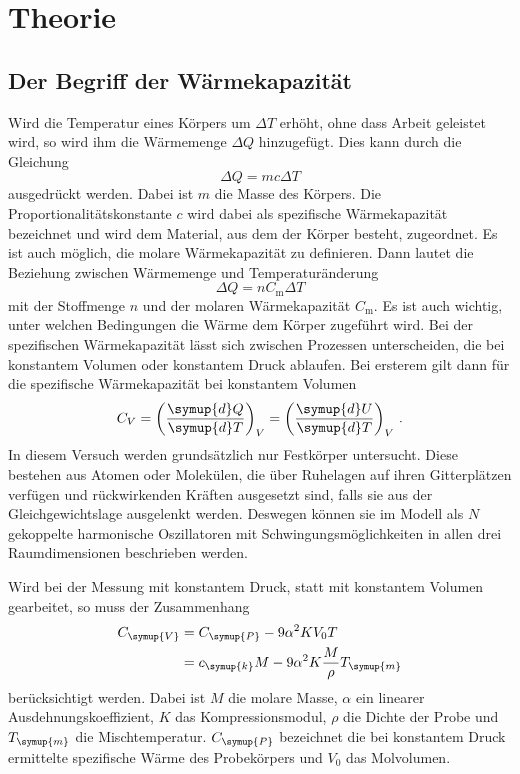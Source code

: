\section{Theorie}
\label{sec:Theorie}
\subsection{Der Begriff der Wärmekapazität}
Wird die Temperatur eines Körpers um $\Delta T$ erhöht, ohne dass Arbeit geleistet
wird, so wird ihm die Wärmemenge $\Delta Q$ hinzugefügt. Dies kann durch die Gleichung
\begin{equation}
  \Delta Q = m c \Delta T
  \label{eqn:specificheat}
\end{equation}
ausgedrückt werden. Dabei ist $m$ die Masse des Körpers. Die Proportionalitätskonstante
$c$ wird dabei als spezifische Wärmekapazität bezeichnet und wird dem Material,
aus dem der Körper besteht, zugeordnet. \newline
Es ist auch möglich, die molare Wärmekapazität zu definieren. Dann lautet die
Beziehung zwischen Wärmemenge und Temperaturänderung
\begin{equation}
  \Delta Q = n C_\text{m} \Delta T
  \label{eqn:molarheat}
\end{equation}
mit der Stoffmenge $n$ und der molaren Wärmekapazität $C_\text{m}$. \newline
Es ist auch wichtig, unter welchen Bedingungen die Wärme dem Körper zugeführt wird.
Bei der spezifischen Wärmekapazität lässt sich zwischen Prozessen unterscheiden,
die bei konstantem Volumen oder konstantem Druck ablaufen. Bei ersterem gilt
dann für die spezifische Wärmekapazität bei konstantem Volumen
\begin{equation}
  C_V = \left(\frac{\symup{d}Q}{\symup{d}T}\right)_V = \left(\frac{\symup{d}U}{\symup{d}T}\right)_V\,.
  \label{eqn:cv}
\end{equation}
In diesem Versuch werden grundsätzlich nur Festkörper untersucht. Diese bestehen
aus Atomen oder Molekülen, die über Ruhelagen auf ihren Gitterplätzen verfügen und
rückwirkenden Kräften ausgesetzt sind, falls sie aus der Gleichgewichtslage ausgelenkt
werden. Deswegen können sie im Modell als $N$ gekoppelte harmonische Oszillatoren
mit Schwingungsmöglichkeiten in allen drei Raumdimensionen beschrieben werden.

Wird bei der Messung mit konstantem Druck, statt mit konstantem Volumen gearbeitet,
so muss der Zusammenhang
\begin{align}
  C_{\symup{V}}&= C_{\symup{P}} -9\alpha^2 K V_0 T \\
  &=c_{\symup{k}}M-9\alpha^2 K\frac{M}{\rho}T_{\symup{m}}
  \label{eqn:druckvolumen}
\end{align}
berücksichtigt werden. Dabei ist $M$ die molare Masse, $\alpha$ ein linearer Ausdehnungskoeffizient,
$K$ das Kompressionsmodul, $\rho$ die Dichte der Probe und $T_{\symup{m}}$ die Mischtemperatur.
$C_{\symup{P}}$ bezeichnet die bei konstantem Druck ermittelte spezifische Wärme
des Probekörpers und $V_0$ das Molvolumen.

